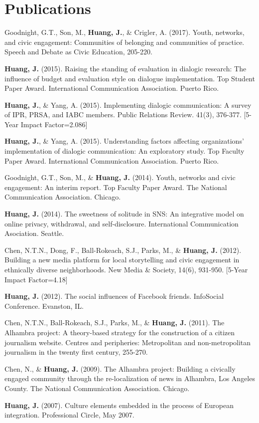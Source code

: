 \documentclass[letterpaper,11pt]{article}
\begin{document}
\section{Publications}
 \begin{itemize}[leftmargin=0.15in, label={}]
   \small
   {\item{
     Goodnight, G.T., Son, M., \textbf{Huang, J.}, \& Crigler, A. (2017). Youth, networks, and civic engagement: Communities of belonging and communities of practice. Speech and Debate as Civic Education, 205-220.
    }}
    {\item{
    \textbf{Huang, J. } (2015). Raising the standing of evaluation in dialogic research: The influence of budget and evaluation style on dialogue implementation. Top Student Paper Award. International Communication Association. Puerto Rico. 
    }}
    {\item{
    \textbf{Huang, J.}, \& Yang, A. (2015). Implementing dialogic communication: A survey of IPR, PRSA, and IABC members. Public Relations Review. 41(3), 376-377. [5-Year Impact Factor=2.086]
    }}
    {\item{
    \textbf{Huang, J.}, \& Yang, A. (2015). Understanding factors affecting organizations’ implementation of dialogic communication: An exploratory study. Top Faculty Paper Award. International Communication Association. Puerto Rico. 
    }}
    {\item{
    Goodnight, G.T., Son, M., \& \textbf{Huang, J.} (2014). Youth, networks and civic engagement: An interim report. Top Faculty Paper Award. The National Communication Association. Chicago. 
    }}
    {\item{
    \textbf{Huang, J.} (2014). The sweetness of solitude in SNS: An integrative model on online privacy, withdrawal, and self-disclosure. International Communication Asociation. Seattle. 
    }}
    {\item{
    Chen, N.T.N., Dong, F., Ball-Rokeach, S.J., Parks, M., \& \textbf{Huang, J.} (2012). Building a new media platform for local storytelling and civic engagement in ethnically diverse neighborhoods. New Media \& Society, 14(6), 931-950. [5-Year Impact Factor=4.18]
    }}
    {\item{
    \textbf{Huang, J.} (2012). The social influences of Facebook friends. InfoSocial Conference. Evanston, IL. 
    }}
    {\item{
    Chen, N.T.N., Ball-Rokeach, S.J., Parks, M., \& \textbf{Huang, J.} (2011). The Alhambra project: A theory-based strategy for the construction of a citizen journalism website. Centres and peripheries: Metropolitan and non-metropolitan journalism in the twenty first century, 255-270. 
    }}
    {\item{
    Chen, N., \& \textbf{Huang, J.} (2009). The Alhambra project: Building a civically engaged community through the re-localization of news in Alhambra, Los Angeles County. The National Communication Association. Chicago. 
    }}
    {\item{
    \textbf{Huang, J.} (2007). Culture elements embedded in the process of European integration. Professional Circle, May 2007.
    }}
 \end{itemize}    

%


\end{document}
